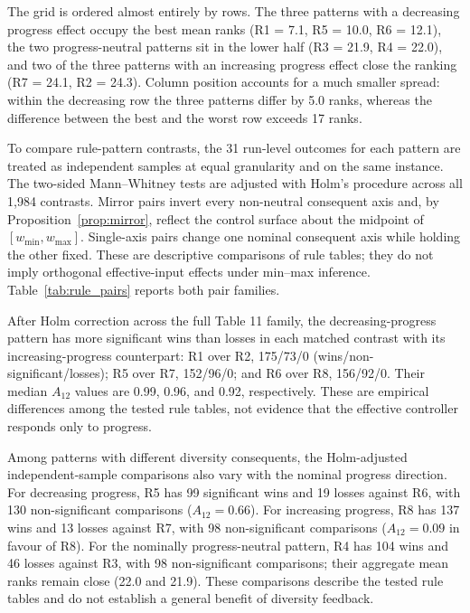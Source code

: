 

The grid is ordered almost entirely by rows. The three patterns with a decreasing progress effect occupy the best mean ranks (R1 = 7.1, R5 = 10.0, R6 = 12.1), the two progress-neutral patterns sit in the lower half (R3 = 21.9, R4 = 22.0), and two of the three patterns with an increasing progress effect close the ranking (R7 = 24.1, R2 = 24.3). Column position accounts for a much smaller spread: within the decreasing row the three patterns differ by 5.0 ranks, whereas the difference between the best and the worst row exceeds 17 ranks.

To compare rule-pattern contrasts, the 31 run-level outcomes for each pattern are treated as independent samples at equal granularity and on the same instance. The two-sided Mann--Whitney tests are adjusted with Holm's procedure across all 1,984 contrasts. Mirror pairs invert every non-neutral consequent axis and, by Proposition~\ref{prop:mirror}, reflect the control surface about the midpoint of $[w_{\min},w_{\max}]$. Single-axis pairs change one nominal consequent axis while holding the other fixed. These are descriptive comparisons of rule tables; they do not imply orthogonal effective-input effects under min--max inference. Table~\ref{tab:rule_pairs} reports both pair families.



After Holm correction across the full Table 11 family, the decreasing-progress pattern has more significant wins than losses in each matched contrast with its increasing-progress counterpart: R1 over R2, 175/73/0 (wins/non-significant/losses); R5 over R7, 152/96/0; and R6 over R8, 156/92/0. Their median $A_{12}$ values are 0.99, 0.96, and 0.92, respectively. These are empirical differences among the tested rule tables, not evidence that the effective controller responds only to progress.

Among patterns with different diversity consequents, the Holm-adjusted independent-sample comparisons also vary with the nominal progress direction. For decreasing progress, R5 has 99 significant wins and 19 losses against R6, with 130 non-significant comparisons ($A_{12}=0.66$). For increasing progress, R8 has 137 wins and 13 losses against R7, with 98 non-significant comparisons ($A_{12}=0.09$ in favour of R8). For the nominally progress-neutral pattern, R4 has 104 wins and 46 losses against R3, with 98 non-significant comparisons; their aggregate mean ranks remain close (22.0 and 21.9). These comparisons describe the tested rule tables and do not establish a general benefit of diversity feedback.


